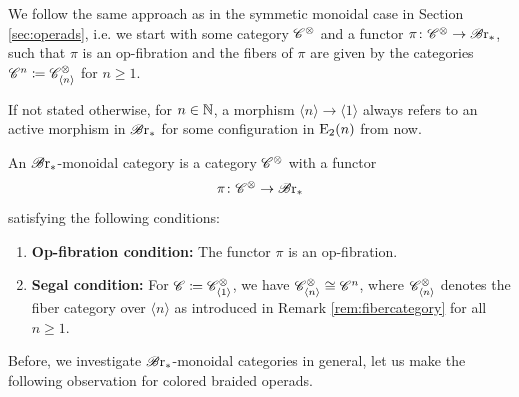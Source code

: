 We follow the same approach as in the symmetic monoidal case in Section
\ref{sec:operads}, i.e. we start with some category $\mathscr{C}^{\otimes}$ and a functor
$\pi \colon \mathscr{C}^{\otimes} \to \mathscr{B} \text{r}_{\ast}$, such that $\pi$ is an op-fibration and the
fibers of $\pi$ are given by the categories $\mathscr{C}^n \coloneqq \mathscr{C}^{\otimes}_{\langle n
\rangle}$ for $n \geq 1$.

If not stated otherwise, for $n \in \mathbb{N}$, a morphism $\langle n \rangle \to
\langle 1 \rangle$ always refers to an active morphism in $\mathscr{B} \text{r}_{\ast}$ for some
configuration in $\operatorname{E}_2(n)$ from now. 

\begin{defin}
    An $\mathscr{B} \text{r}_{\ast}$-monoidal category is a category $\mathscr{C}^{\otimes}$ with a functor
    \[
        \pi \colon \mathscr{C}^{\otimes} \to \mathscr{B} \text{r}_{\ast}
    \]
    satisfying the following conditions:
        \begin{enumerate}[(M1)]
            \item \textbf{Op-fibration condition:} The functor $\pi$ is an
            op-fibration.
            \item \textbf{Segal condition:} For $\mathscr{C} \coloneqq \mathscr{C}^{\otimes}_{\langle
            1 \rangle}$, we have $\mathscr{C}^{\otimes}_{\langle n \rangle} \cong \mathscr{C}^n$,
            where $\mathscr{C}^{\otimes}_{\langle n \rangle}$ denotes the fiber category over
            $\langle n \rangle$ as introduced in Remark \ref{rem:fibercategory}
            for all $n \geq 1$.
        \end{enumerate}

\end{defin}

Before, we investigate $\mathscr{B} \text{r}_{\ast}$-monoidal categories in general, let us make the following observation
for colored braided operads.

